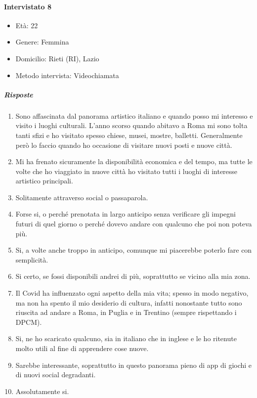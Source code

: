\documentclass{article}
\begin{document}
\paragraph{Intervistato 8}
\begin{itemize}
\item Età: 22
\item Genere: Femmina
\item Domicilio: Rieti (RI), Lazio
\item Metodo intervista: Videochiamata
\end{itemize}
\subparagraph{Risposte}
\begin{enumerate}
\item Sono affascinata dal panorama artistico italiano e quando posso mi interesso e visito i luoghi culturali. L’anno scorso quando abitavo a Roma mi sono tolta tanti sfizi e ho visitato spesso chiese, musei, mostre, balletti. Generalmente però lo faccio quando ho occasione di visitare nuovi posti e nuove città.
\item Mi ha frenato sicuramente la disponibilità economica e del tempo, ma tutte le volte che ho viaggiato in nuove città ho visitato tutti i luoghi di interesse artistico principali.
\item Solitamente attraverso social o passaparola.
\item Forse si, o perché prenotata in largo anticipo senza verificare gli impegni futuri di quel giorno o perché dovevo andare con qualcuno che poi non poteva più.
\item Si, a volte anche troppo in anticipo, comunque mi piacerebbe poterlo fare con semplicità.
\item Si certo, se fossi disponibili andrei di più, soprattutto se vicino alla mia zona.
\item Il Covid ha influenzato ogni aspetto della mia vita; spesso in modo negativo, ma non ha spento il mio desiderio di cultura, infatti nonostante tutto sono riuscita ad andare a Roma, in Puglia e in Trentino (sempre rispettando i DPCM).
\item Si, ne ho scaricato qualcuno, sia in italiano che in inglese e le ho ritenute molto utili al fine di apprendere cose nuove.
\item Sarebbe interessante, soprattutto in questo panorama pieno di app di giochi e di nuovi social degradanti.
\item Assolutamente si.
\end{enumerate}
\end{document}
